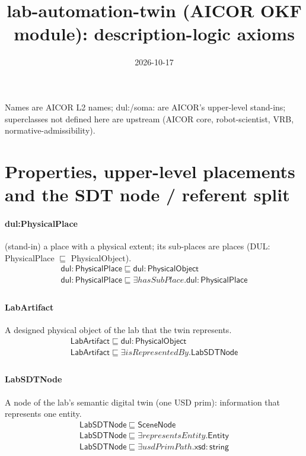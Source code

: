 \documentclass[10pt]{article}
\title{lab-automation-twin (AICOR OKF module): description-logic axioms}
\date{2026-10-17}
\begin{document}
\maketitle
\small
Names are AICOR L2 names; \textsf{dul:}/\textsf{soma:} are AICOR's upper-level stand-ins; superclasses not defined here are upstream (AICOR core, robot-scientist, VRB, normative-admissibility).

\section*{Properties, upper-level placements and the SDT node / referent split}
\paragraph{dul:PhysicalPlace} (stand-in) a place with a physical extent; its sub-places are places (DUL: PhysicalPlace $\sqsubseteq$ PhysicalObject).
\[\begin{array}{l}
\mathsf{dul{:}PhysicalPlace} \sqsubseteq  \mathsf{dul{:}PhysicalObject} \\
\mathsf{dul{:}PhysicalPlace} \sqsubseteq  \exists \mathit{hasSubPlace}.\mathsf{dul{:}PhysicalPlace} \\
\end{array}\]
\paragraph{LabArtifact} A designed physical object of the lab that the twin represents.
\[\begin{array}{l}
\mathsf{LabArtifact} \sqsubseteq  \mathsf{dul{:}PhysicalObject} \\
\mathsf{LabArtifact} \sqsubseteq  \exists \mathit{isRepresentedBy}.\mathsf{LabSDTNode} \\
\end{array}\]
\paragraph{LabSDTNode} A node of the lab's semantic digital twin (one USD prim): information that represents one entity.
\[\begin{array}{l}
\mathsf{LabSDTNode} \sqsubseteq  \mathsf{SceneNode} \\
\mathsf{LabSDTNode} \sqsubseteq  \exists \mathit{representsEntity}.\mathsf{Entity} \\
\mathsf{LabSDTNode} \sqsubseteq  \exists \mathit{usdPrimPath}.\mathsf{xsd{:}string} \\
\end{array}\]
\end{document}

